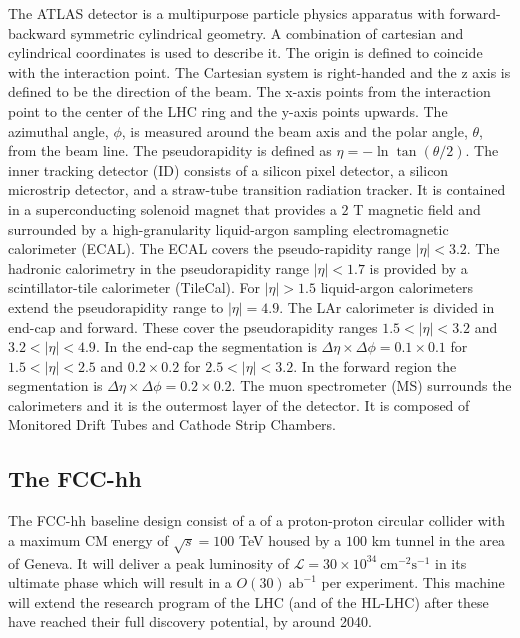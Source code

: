The ATLAS detector is a multipurpose particle physics apparatus with forward-backward symmetric  cylindrical geometry. A combination of cartesian and cylindrical coordinates is used to describe it. The origin is defined to coincide with the interaction point. The Cartesian system is right-handed and the z axis is defined to be the direction of the beam. The x-axis points from the interaction point to the center of the LHC ring and the y-axis points upwards. The azimuthal angle, $\phi$, is measured around the beam axis and the polar angle, $\theta$, from the beam line. The pseudorapidity is defined as $\eta = − \ln \tan(\theta/2)$. The inner tracking detector (ID) consists of  a  silicon  pixel detector,  a  silicon  microstrip detector, and a straw-tube transition radiation tracker. It is contained in a superconducting solenoid magnet that provides a $2$ T magnetic field and surrounded by a high-granularity liquid-argon sampling electromagnetic calorimeter (ECAL). The ECAL covers the pseudo-rapidity range $|\eta|<3.2$. The hadronic calorimetry in the pseudorapidity range $|\eta| < 1.7$ is provided by a scintillator-tile calorimeter (TileCal). For $|\eta|>1.5$ liquid-argon calorimeters extend the pseudorapidity range to $|\eta|=4.9$. The LAr calorimeter is divided in end-cap and forward. These cover the pseudorapidity ranges $1.5 < |\eta| < 3.2$ and $3.2 < |\eta| <
4.9$. In the end-cap the segmentation is $\Delta\eta\times\Delta\phi = 0.1 \times 0.1$ for $1.5 < |\eta| < 2.5$ and $0.2 \times 0.2$ for $2.5 < |\eta| < 3.2$. In the forward region the segmentation is $\Delta\eta\times\Delta\phi = 0.2 \times 0.2$. The muon spectrometer (MS) surrounds the calorimeters and it is the outermost layer of the detector. It is composed of Monitored Drift Tubes and Cathode Strip Chambers.

\subsection{The FCC-hh}

The FCC-hh baseline design consist of a of a proton-proton circular collider with a maximum CM energy of $\sqrt{s}=100$ TeV housed by a $100$ km tunnel in the area of Geneva. It will deliver a peak luminosity of $\mathcal{L}=30\times 10^{34}~\text{cm}^{-2}\text{s}^{-1}$ in its ultimate phase which will result in a $O(30)~\text{ab}^{-1}$ per experiment. This machine will extend the research program of the LHC (and of the HL-LHC) after these have reached their full discovery potential, by around 2040.

